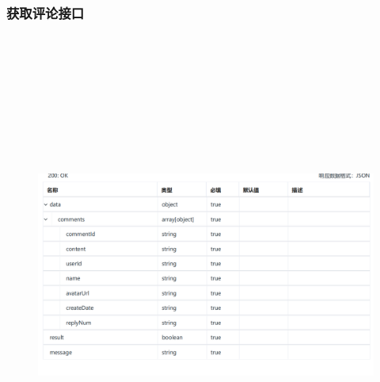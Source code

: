         \subsubsection{获取评论接口}
        \begin{figure}[h]
            \centering
            \includegraphics[height=16.0cm,width=14.0cm]{design/image/api20.png} 
            \end{figure}  
            \newpage    
